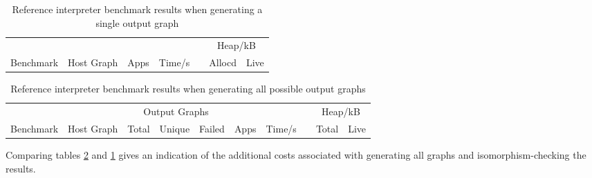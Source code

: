 % 
%
% 


\begin{table}[h]
\begin{minipage}{\textwidth}
\centering

\begin{tabular}{llrrcrr}
\hline 
&  & & & & \multicolumn{2}{c}{Heap/kB}\\
Benchmark          & Host Graph & Apps & Time/s   & & Allocd & Live \\
\hline 

\end{tabular}

\caption[Reference interpreter benchmarks]{Reference interpreter benchmark results when generating a single output graph}

\label{table:resultsSingle}
\end{minipage}
\end{table}



\begin{table}[h]
\begin{minipage}{\textwidth}
\centering

\begin{tabular}{llrrrrrcrr}
\hline 
&  & \multicolumn{3}{c}{Output Graphs} & & && \multicolumn{2}{c}{Heap/kB}\\
Benchmark          & Host Graph & Total & Unique   & Failed & Apps & Time/s   & & Total  & Live \\
\hline 

\end{tabular}

\caption[Reference interpreter benchmarks]{Reference interpreter benchmark results when generating all possible output graphs}

\label{table:resultsAll}
\end{minipage}
\end{table}


Comparing tables \ref{table:resultsAll} and \ref{table:resultsSingle} gives an indication of the additional costs associated with generating all graphs and isomorphism-checking the results.


